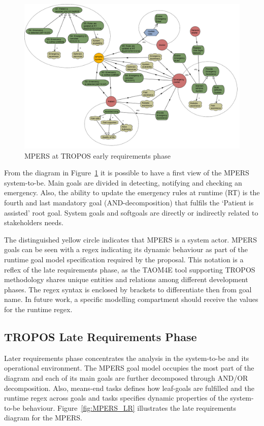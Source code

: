 \begin{figure}[ht]
\centering
\includegraphics[width=1\textwidth]{imgs/MPERS_ER.png}
\caption{MPERS at TROPOS early requirements phase}
\label{fig:MPERS_ER}
\end{figure}

From the diagram in Figure~\ref{fig:MPERS_ER} it is possible to have a first view of the MPERS system-to-be. Main goals are divided in detecting, notifying and checking an emergency. Also, the ability to update the emergency rules at runtime (RT) is the fourth and last mandatory goal (AND-decomposition) that fulfils the `Patient is assisted' root goal. System goals and softgoals are directly or indirectly related to stakeholders needs.

The distinguished yellow circle indicates that MPERS is a system actor. MPERS goals can be seen with a regex indicating its dynamic behaviour as part of the runtime goal model specification required by the proposal. This notation is a reflex of the late requirements phase, as the TAOM4E tool supporting TROPOS methodology shares unique entities and relations among different development phases. The regex syntax is enclosed by brackets to differentiate then from goal name. In future work, a specific modelling compartment should receive the values for the runtime regex.

\subsection{TROPOS Late Requirements Phase}

Later requirements phase concentrates the analysis in the system-to-be and its operational environment. The MPERS goal model occupies the most part of the diagram and each of its main goals are further decomposed through AND/OR decomposition. Also, means-end tasks defines how leaf-goals are fulfilled and the runtime regex across goals and tasks specifies dynamic properties of the system-to-be behaviour. Figure~\ref{fig:MPERS_LR} illustrates the late requirements diagram for the MPERS.

